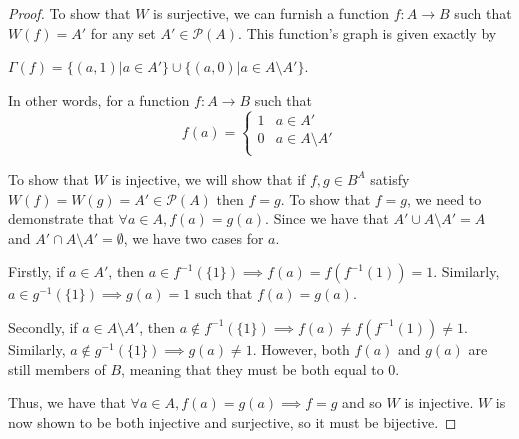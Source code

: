 \documentclass[12pt,letterpaper]{article}
\theoremstyle{definition}
\begin{document}
\begin{proof}
    To show that $W$ is surjective, we can furnish a function $f: A \rightarrow B$ such that $W(f) = A'$ for any set $A' \in \mathcal{P}(A)$. 
    This function's graph is given exactly by 
    \begin{center}
        $\Gamma(f) = \{(a, 1) | a \in A'\} \cup \{(a, 0) | a \in A \setminus A'\}$.
    \end{center}
    
    In other words, for a function $f: A \rightarrow B$ such that 
    \[ f(a) = 
    \begin{cases} 
        1 & a \in A' \\
        0 & a \in A \setminus A' \\
   \end{cases} 
    \]

    To show that $W$ is injective, we will show that if $f, g \in B^A$ satisfy $W(f) = W(g) = A' \in \mathcal{P}(A)$ then $f = g$. 
    To show that $f = g$, we need to demonstrate that $\forall a \in A, f(a) = g(a)$. Since we have that $A' \cup A \setminus A' = A$ and $A' \cap A \setminus A' = \emptyset$, we have two cases for $a$.
    
    Firstly, if $a \in A'$, then $a \in f^{-1}(\{1\}) \implies f(a) = f(f^{-1}(1)) = 1$. Similarly, $a \in g^{-1}(\{1\}) \implies g(a) = 1$ such that $f(a) = g(a)$.
    
    Secondly, if $a \in A \setminus A'$, then $a \notin f^{-1}(\{1\}) \implies f(a) \neq f(f^{-1}(1)) \neq 1$. Similarly, $a \notin g^{-1}(\{1\}) \implies g(a) \neq 1$. However, both $f(a)$ and $g(a)$ are still members of $B$, meaning that they must be both equal to $0$.
    
    Thus, we have that $\forall a \in A, f(a) = g(a) \implies f = g$ and so $W$ is injective. $W$ is now shown to be both injective and surjective, so it must be bijective.
\end{proof}
\end{document}
